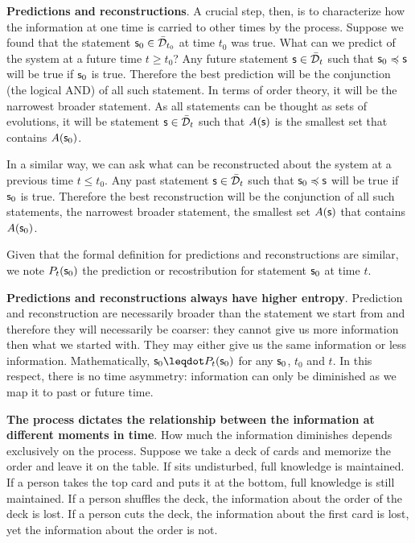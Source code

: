 \documentclass[10pt, onecolumn, longbibliography, nofootinbib]{revtex4-2}
\begin{document}
\textbf{Predictions and reconstructions}. A crucial step, then, is to characterize how the information at one time is carried to other times by the process. Suppose we found that the statement $\mathsf{s}_0 \in \bar{\mathcal{D}}_{t_0}$ at time $t_0$ was true. What can we predict of the system at a future time $t \geq t_0$? Any future statement $\mathsf{s} \in \bar{\mathcal{D}}_{t}$ such that $\mathsf{s}_0 \preccurlyeq \mathsf{s}$ will be true if $\mathsf{s}_0$ is true. Therefore the best prediction will be the conjunction (the logical AND) of all such statement. In terms of order theory, it will be the narrowest broader statement. As all statements can be thought as sets of evolutions, it will be statement $\mathsf{s} \in \bar{\mathcal{D}}_{t}$ such that $A(\mathsf{s})$ is the smallest set that contains $A(\mathsf{s}_0)$.

In a similar way, we can ask what can be reconstructed about the system at a previous time $t \leq t_0$. Any past statement $\mathsf{s} \in \bar{\mathcal{D}}_{t}$ such that $\mathsf{s}_0 \preccurlyeq \mathsf{s}$ will be true if $\mathsf{s}_0$ is true. Therefore the best reconstruction will be the conjunction of all such statements, the narrowest broader statement, the smallest set $A(\mathsf{s})$ that contains $A(\mathsf{s}_0)$.

Given that the formal definition for predictions and reconstructions are similar, we note $P_{t}(\mathsf{s}_0)$ the prediction or recostribution for statement $\mathsf{s}_0$ at time $t$.

\textbf{Predictions and reconstructions always have higher entropy}. Prediction and reconstruction are necessarily broader than the statement we start from and therefore they will necessarily be coarser: they cannot give us more information then what we started with. They may either give us the same information or less information. Mathematically, $\stmt_0 \finer P_t(\stmt_0)$ for any $\mathsf{s}_0$, $t_0$ and $t$. In this respect, there is no time asymmetry: information can only be diminished as we map it to past or future time.

\textbf{The process dictates the relationship between the information at different moments in time}. How much the information diminishes depends exclusively on the process. Suppose we take a deck of cards and memorize the order and leave it on the table. If sits undisturbed, full knowledge is maintained. If a person takes the top card and puts it at the bottom, full knowledge is still maintained. If a person shuffles the deck, the information about the order of the deck is lost. If a person cuts the deck, the information about the first card is lost, yet the information about the order is not.
\end{document}
